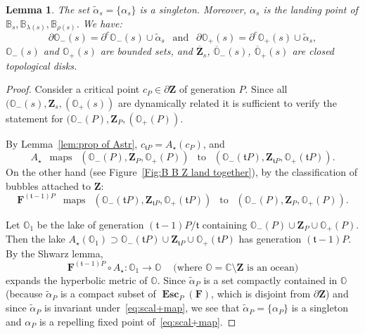 \documentclass{amsart}
\renewcommand{\sp}{{\ \ }}
\newcommand{\1}{{\mathbb 1 }}
\newcommand{\bB}{{\mathbb{B}}}
\newcommand{\bO}{{\mathbb{O}}}
\newcommand{\bF}{{\mathbf F}}
\newcommand{\bZ}{{\mathbf Z}}
\newcommand{\str}{{\star}}
\renewcommand{\tt}{\mathfrak{t}}
\newcommand{\C}{\mathbb{C}}
\newtheorem{lem}[thm]{Lemma}
\theoremstyle{remark}
\numberwithin{equation}{section}
\theoremstyle{definition}
\newcommand{\Esc}{{\boldsymbol{\operatorname{Esc}}}}
\theoremstyle{nonumberbreak}
\begin{document}
\begin{lem}
\label{lem:alpha' is a pnt} The set $\widetilde \alpha_s =\{\alpha_s\}$ is a singleton. Moreover, $\alpha_s$ is the landing point of $\bB_s,\bB_{\lambda(s)},\bB_{\rho(s)}$. We have: 
\[\partial \bO_-(s)=\partial ^c \bO_-(s)\cup \widetilde \alpha_s\sp \text { and }\sp  \partial \bO_+(s)=\partial ^c \bO_+(s)\cup \widetilde \alpha_s,\]
 $ \bO_-(s)$ and $ \bO_+(s)$ are bounded sets, and  $\overline \bZ_s$, $\overline \bO_-(s)$, $\overline \bO_+(s)$ are closed topological disks. 
\end{lem}
\begin{proof}



Consider a critical point $c_P\in \partial \bZ$ of generation $P$. Since all $(\bO_-(s),\bZ_s,(\bO_+(s))$ are dynamically related it is sufficient to verify the statement for $(\bO_-(P),\bZ_P,(\bO_+(P))$.



By Lemma~\ref{lem:prop of Astr}, $c_{\tt P}=A_{\str} (c_{ P})$,  and 
\begin{equation}
\label{eq:1:lem:alpha' is a pnt}
A_{\str}\sp  \text{ maps }\sp  (\bO_-(P),\bZ_P,\bO_+(P))  \sp\text{ to }\sp  (\bO_-(\tt P),\bZ_{\tt P},\bO_+(\tt P)).
\end{equation}
 On the other hand (see Figure~\ref{Fig:B B Z land together}), by the classification of bubbles attached to $\bZ$:
 \begin{equation}
\label{eq:2:lem:alpha' is a pnt}
 \bF^{(\tt-1)P}\sp \text{ maps }\sp(\bO_-(\tt P),\bZ_{\tt P},\bO_+(\tt P))\sp\text{ to }\sp(\bO_-(P),\bZ_P,\bO_+(P)).
 \end{equation}


Let $\bO_1$ be the lake of generation $(\tt-1)P/\tt$ containing $\bO_-( P)\cup \bZ_{P}\cup \bO_+(P)$. Then the lake $A_{\str}(\bO_1)\supset \bO_-(\tt P)\cup \bZ_{\tt P}\cup \bO_+(\tt P)$ has generation $(\tt-1)P$. By the Shwarz lemma, \begin{equation}
\label{eq:scal+map}
\bF^{(\tt-1)P}\circ A_{\str}\colon \bO_1\to \bO\sp\sp \text{ (where $\bO=\C\setminus \bZ$ is an ocean)}
\end{equation}
expands the hyperbolic metric of $\bO$. Since $\widetilde \alpha_P$ is a set  compactly contained in $\bO$ (because $\widetilde \alpha_P$ is a compact subset of $\Esc_{P}(\bF)$, which is disjoint from $\partial \bZ$) and since  $\widetilde \alpha_P$ is invariant  under~\eqref{eq:scal+map}, we see that $\widetilde \alpha_P =\{\alpha_P\}$ is a singleton and $\alpha_P$ is a repelling fixed point of~\eqref{eq:scal+map}. 




\end{proof}
\end{document}
